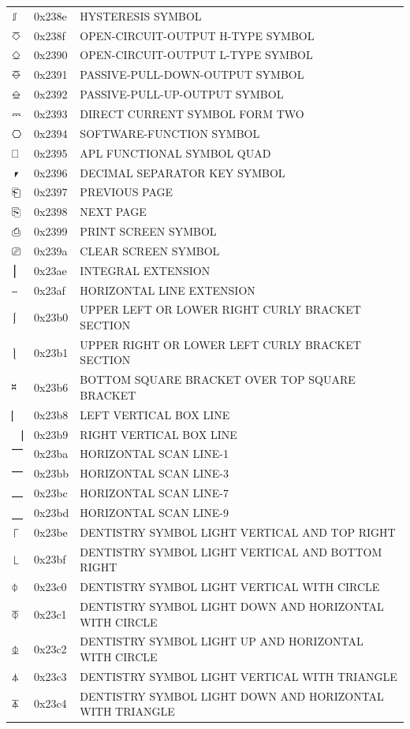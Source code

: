 \documentclass[12pt, twoside]{article}
\begin{document}
\begin{longtable}{L{1.0cm} L{2.0cm} >{\footnotesize}L{10cm}}
$⎎$&0x238e&HYSTERESIS SYMBOL\\
$⎏$&0x238f&OPEN-CIRCUIT-OUTPUT H-TYPE SYMBOL\\
$⎐$&0x2390&OPEN-CIRCUIT-OUTPUT L-TYPE SYMBOL\\
$⎑$&0x2391&PASSIVE-PULL-DOWN-OUTPUT SYMBOL\\
$⎒$&0x2392&PASSIVE-PULL-UP-OUTPUT SYMBOL\\
$⎓$&0x2393&DIRECT CURRENT SYMBOL FORM TWO\\
$⎔$&0x2394&SOFTWARE-FUNCTION SYMBOL\\
$⎕$&0x2395&APL FUNCTIONAL SYMBOL QUAD\\
$⎖$&0x2396&DECIMAL SEPARATOR KEY SYMBOL\\
$⎗$&0x2397&PREVIOUS PAGE\\
$⎘$&0x2398&NEXT PAGE\\
$⎙$&0x2399&PRINT SCREEN SYMBOL\\
$⎚$&0x239a&CLEAR SCREEN SYMBOL\\
$⎮$&0x23ae&INTEGRAL EXTENSION\\
$⎯$&0x23af&HORIZONTAL LINE EXTENSION\\
$⎰$&0x23b0&UPPER LEFT OR LOWER RIGHT CURLY BRACKET SECTION\\
$⎱$&0x23b1&UPPER RIGHT OR LOWER LEFT CURLY BRACKET SECTION\\
$⎶$&0x23b6&BOTTOM SQUARE BRACKET OVER TOP SQUARE BRACKET\\
$⎸$&0x23b8&LEFT VERTICAL BOX LINE\\
$⎹$&0x23b9&RIGHT VERTICAL BOX LINE\\
$⎺$&0x23ba&HORIZONTAL SCAN LINE-1\\
$⎻$&0x23bb&HORIZONTAL SCAN LINE-3\\
$⎼$&0x23bc&HORIZONTAL SCAN LINE-7\\
$⎽$&0x23bd&HORIZONTAL SCAN LINE-9\\
$⎾$&0x23be&DENTISTRY SYMBOL LIGHT VERTICAL AND TOP RIGHT\\
$⎿$&0x23bf&DENTISTRY SYMBOL LIGHT VERTICAL AND BOTTOM RIGHT\\
$⏀$&0x23c0&DENTISTRY SYMBOL LIGHT VERTICAL WITH CIRCLE\\
$⏁$&0x23c1&DENTISTRY SYMBOL LIGHT DOWN AND HORIZONTAL WITH CIRCLE\\
$⏂$&0x23c2&DENTISTRY SYMBOL LIGHT UP AND HORIZONTAL WITH CIRCLE\\
$⏃$&0x23c3&DENTISTRY SYMBOL LIGHT VERTICAL WITH TRIANGLE\\
$⏄$&0x23c4&DENTISTRY SYMBOL LIGHT DOWN AND HORIZONTAL WITH TRIANGLE\\

\end{longtable}
\end{document}
